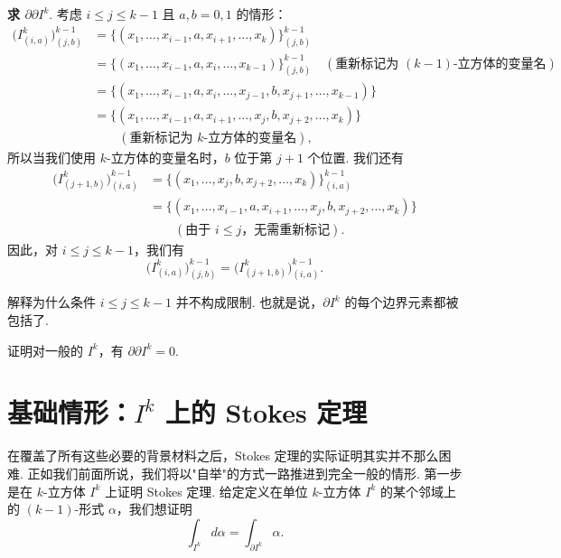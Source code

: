 \textbf{求 $\partial\partial I^k$}. 考虑 $i\leq j\leq k-1$ 且 $a,b=0,1$ 的情形：
\[
\begin{aligned}
\bigl(I^k_{(i,a)}\bigr)^{k-1}_{(j,b)}&=\bigl\{(x_1,\ldots,x_{i-1},a,x_{i+1},\ldots,x_k)\bigr\}^{k-1}_{(j,b)}\\
&=\bigl\{(x_1,\ldots,x_{i-1},a,x_i,\ldots,x_{k-1})\bigr\}^{k-1}_{(j,b)}\quad(\text{重新标记为 }(k-1)\text{-立方体的变量名})\\
&=\bigl\{(x_1,\ldots,x_{i-1},a,x_i,\ldots,x_{j-1},b,x_{j+1},\ldots,x_{k-1})\bigr\}\\
&=\bigl\{(x_1,\ldots,x_{i-1},a,x_{i+1},\ldots,x_j,b,x_{j+2},\ldots,x_k)\bigr\}\\
&\qquad(\text{重新标记为 }k\text{-立方体的变量名}),
\end{aligned}
\]
所以当我们使用 $k$-立方体的变量名时，$b$ 位于第 $j+1$ 个位置. 我们还有
\[
\begin{aligned}
\bigl(I^k_{(j+1,b)}\bigr)^{k-1}_{(i,a)}&=\bigl\{(x_1,\ldots,x_j,b,x_{j+2},\ldots,x_k)\bigr\}^{k-1}_{(i,a)}\\
&=\bigl\{(x_1,\ldots,x_{i-1},a,x_{i+1},\ldots,x_j,b,x_{j+2},\ldots,x_k)\bigr\}\\
&\qquad(\text{由于 }i\leq j\text{，无需重新标记}).
\end{aligned}
\]
因此，对 $i\leq j\leq k-1$，我们有
\[
\bigl(I^k_{(i,a)}\bigr)^{k-1}_{(j,b)}=\bigl(I^k_{(j+1,b)}\bigr)^{k-1}_{(i,a)}.
\]

\begin{question}\label{q:11-11}
解释为什么条件 $i\leq j\leq k-1$ 并不构成限制. 也就是说，$\partial I^k$ 的每个边界元素都被包括了.
\end{question}

\begin{question}\label{q:11-12}
证明对一般的 $I^k$，有 $\partial\partial I^k=0$.
\end{question}

\section{基础情形：$I^k$ 上的 Stokes 定理}

在覆盖了所有这些必要的背景材料之后，Stokes 定理的实际证明其实并不那么困难. 正如我们前面所说，我们将以"自举"的方式一路推进到完全一般的情形. 第一步是在 $k$-立方体 $I^k$ 上证明 Stokes 定理. 给定定义在单位 $k$-立方体 $I^k$ 的某个邻域上的 $(k-1)$-形式 $\alpha$，我们想证明
\[
\int_{I^k}d\alpha=\int_{\partial I^k}\alpha.
\]

